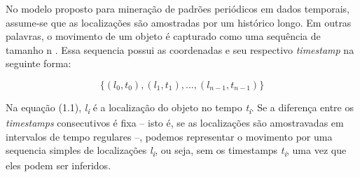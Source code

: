 \documentclass[ppgc,pep]{iiufrgs}
\begin{document}



No modelo proposto para mineração
de padrões periódicos em dados temporais,
assume-se que as localizações são amostradas por um histórico
longo. Em outras palavras, o movimento de um objeto é capturado
como uma sequência de tamanho n \cite{10.1109/TKDE.2007.1002}. Essa sequencia possui 
as coordenadas e seu respectivo {\it timestamp} na seguinte forma:


\begin{equation}
\{(l_0, t_0), (l_1, t_1), ..., (l_{n-1}, t_{n-1})\}
\end{equation}

Na equação (1.1), {\it l\textsubscript{i}} é a localização do objeto no tempo {\it t\textsubscript{i}}.
Se a diferença entre os {\it timestamps} consecutivos é fixa -- isto é,
se as localizações são amostravadas em intervalos de tempo regulares --,
podemos representar o movimento por uma sequencia simples de localizações
{\it l\textsubscript{i}}, ou seja, sem os timestamps {\it t\textsubscript{i}}, uma vez que eles podem ser inferidos.
\end{document}
